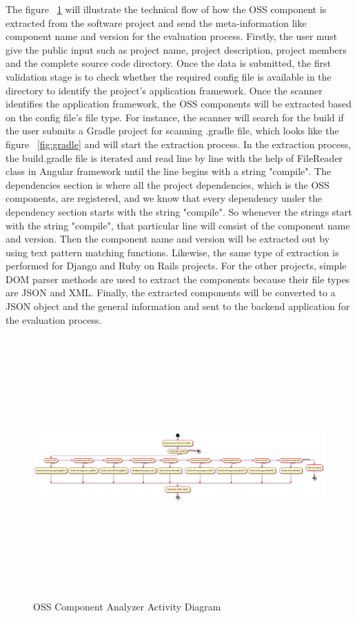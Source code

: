 The figure ~\ref{fig:Analyzer_Activity_Diagram} will illustrate the technical flow of how the \acs{OSS} component is extracted from the software project and send the meta-information like component name and version for the evaluation process. Firstly, the user must give the public input such as project name, project description, project members and the complete source code directory. Once the data is submitted, the first validation stage is to check whether the required config file is available in the directory to identify the project's application framework. Once the scanner identifies the application framework, the \acs{OSS} components will be extracted based on the config file's file type. For instance, the scanner will search for the build if the user submits a Gradle project for scanning .gradle file, which looks like the figure ~\ref{fig:gradle} and will start the extraction process. In the extraction process, the build.gradle file is iterated and read line by line with the help of FileReader class in Angular framework until the line begins with a string "compile". The dependencies section is where all the project dependencies, which is the \acs{OSS} components, are registered, and we know that every dependency under the dependency section starts with the string "compile". So whenever the strings start with the string "compile", that particular line will consist of the component name and version. Then the component name and version will be extracted out by using text pattern matching functions. Likewise, the same type of extraction is performed for Django and Ruby on Rails projects. For the other projects, simple \acs{DOM} parser methods are used to extract the components because their file types are JSON and XML. Finally, the extracted components will be converted to a JSON object and the general information and sent to the backend application for the evaluation process.   

 \begin{figure}[H]
 	\centering
	\includegraphics[width=17cm,height=10cm]{includes/OSS_Analyzer_Activity_Diagram.png}
	\centering
	\caption{\acs{OSS} Component Analyzer Activity Diagram}
	\label{fig:Analyzer_Activity_Diagram}
\end{figure}
